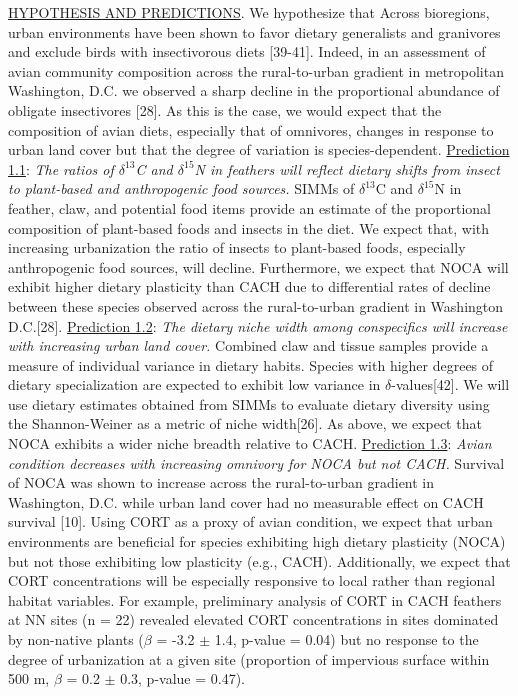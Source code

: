 \documentclass[12pt]{article}
\begin{document}
\noindent \underline{HYPOTHESIS AND PREDICTIONS}. We hypothesize that  Across bioregions, urban environments have been shown to favor dietary generalists and granivores and exclude birds with insectivorous diets [39-41]. Indeed, in an assessment of avian community composition across the rural-to-urban gradient in metropolitan Washington, D.C. we observed a sharp decline in the proportional abundance of obligate insectivores [28]. As this is the case, we would expect that the composition of avian diets, especially that of omnivores, changes in response to urban land cover but that the degree of variation is species-dependent. \underline{Prediction 1.1}: \textit{The ratios of $\delta^{13}$C and $\delta^{15}$N in feathers will reflect dietary shifts from insect to plant-based and anthropogenic food sources.}  SIMMs of $\delta^{13}$C and  $\delta^{15}$N in feather, claw, and potential food items provide an estimate of the proportional composition of plant-based foods and insects in the diet. We expect that, with increasing urbanization the ratio of insects to plant-based foods, especially anthropogenic food sources, will decline. Furthermore, we expect that NOCA will exhibit higher dietary plasticity than CACH due to differential rates of decline between these species observed across the rural-to-urban gradient in Washington D.C.[28]. \underline{Prediction 1.2}: \textit{The dietary niche width among conspecifics will increase with increasing urban land cover.} Combined claw and tissue samples provide a measure of individual variance in dietary habits. Species with higher degrees of dietary specialization are expected to exhibit low variance in $\delta$-values[42]. We will use dietary estimates obtained from SIMMs to evaluate dietary diversity using the Shannon-Weiner as a metric of niche width[26]. As above, we expect that NOCA exhibits a wider niche breadth relative to CACH. \underline{Prediction 1.3}: \textit{Avian condition decreases with increasing omnivory for NOCA but not CACH.} Survival of NOCA was shown to increase across the rural-to-urban gradient in Washington, D.C. while urban land cover had no measurable effect on CACH survival [10]. Using CORT as a proxy of avian condition, we expect that urban environments are beneficial for species exhibiting high dietary plasticity (NOCA) but not those exhibiting low plasticity (e.g., CACH). Additionally, we expect that CORT concentrations will be especially responsive to local rather than regional habitat variables. For example, preliminary analysis of CORT in CACH feathers at NN sites (n = 22) revealed elevated CORT concentrations in sites dominated by non-native plants ($\beta$ = -3.2 $\pm$ 1.4, p-value = 0.04) but no response to the degree of urbanization at a given site (proportion of impervious surface within 500 m, $\beta$ = 0.2 $\pm$ 0.3, p-value = 0.47). 
\end{document}
